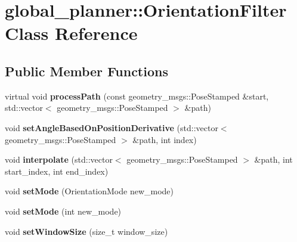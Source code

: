 \hypertarget{classglobal__planner_1_1_orientation_filter}{}\section{global\+\_\+planner\+:\+:Orientation\+Filter Class Reference}
\label{classglobal__planner_1_1_orientation_filter}
\subsection*{Public Member Functions}
\begin{DoxyCompactItemize}
\item 
\mbox{\label{classglobal__planner_1_1_orientation_filter_a90c8cd6c44018145bf0ae3e71580c1b1}} 
virtual void {\bfseries process\+Path} (const geometry\+\_\+msgs\+::\+Pose\+Stamped \&start, std\+::vector$<$ geometry\+\_\+msgs\+::\+Pose\+Stamped $>$ \&path)
\item 
\mbox{\label{classglobal__planner_1_1_orientation_filter_a59770ba7f30c0e87e62b407bc44feda1}} 
void {\bfseries set\+Angle\+Based\+On\+Position\+Derivative} (std\+::vector$<$ geometry\+\_\+msgs\+::\+Pose\+Stamped $>$ \&path, int index)
\item 
\mbox{\label{classglobal__planner_1_1_orientation_filter_a36817535ca10c2662b6cc2d0919576bf}} 
void {\bfseries interpolate} (std\+::vector$<$ geometry\+\_\+msgs\+::\+Pose\+Stamped $>$ \&path, int start\+\_\+index, int end\+\_\+index)
\item 
\mbox{\label{classglobal__planner_1_1_orientation_filter_a1934b57509ac8d2074695bee82c8e178}} 
void {\bfseries set\+Mode} (Orientation\+Mode new\+\_\+mode)
\item 
\mbox{\label{classglobal__planner_1_1_orientation_filter_a7419925acb4ebb8b67bf1ae95f9c4333}} 
void {\bfseries set\+Mode} (int new\+\_\+mode)
\item 
\mbox{\label{classglobal__planner_1_1_orientation_filter_acf2026f87791f87970220d7a42e42422}} 
void {\bfseries set\+Window\+Size} (size\+\_\+t window\+\_\+size)
\end{DoxyCompactItemize}
